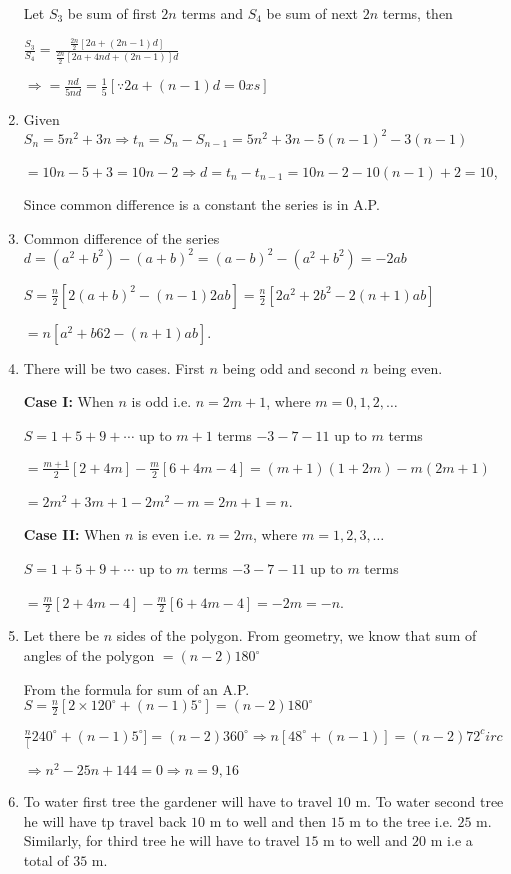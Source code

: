 \begin{enumerate}
  Let $S_3$ be sum of first $2n$ terms and $S_4$ be sum of next $2n$ terms, then

  $\frac{S_3}{S_4} = \frac{\tfrac{2n}{2}[2a + (2n - 1)d]}{\tfrac{2n}{2}[2a + 4nd + (2n - 1)]d}$

  $\Rightarrow = \frac{nd}{5nd} = \frac{1}{5}[\because 2a + (n - 1)d = 0xs]$
\item Given $S_n = 5n^2 + 3n \Rightarrow t_n = S_n - S_{n - 1} = 5n^2 + 3n - 5(n - 1)^2 - 3(n - 1)$

  $= 10n - 5 + 3 = 10n - 2 \Rightarrow d = t_n - t_{n - 1} = 10n - 2 - 10(n - 1) + 2 = 10$,

  Since common difference is a constant the series is in A.P.
\item Common difference of the series $d = (a^2 + b^2) - (a + b)^2 = (a - b)^2 - (a^2 + b^2) = -2ab$

  $S = \frac{n}{2}[2(a + b)^2 - (n - 1)2ab] = \frac{n}{2}[2a^2 + 2b^2 - 2(n + 1)ab]$

  $= n[a^2 + b62 - (n + 1)ab]$.
\item There will be two cases. First $n$ being odd and second $n$ being even.

  {\bf Case I:} When $n$ is odd i.e. $n = 2m + 1$, where $m = 0, 1, 2, \ldots$

  $S = 1 + 5 + 9 + \cdots$ up to $m + 1$ terms $- 3 - 7 - 11$ up to $m$ terms

  $= \frac{m + 1}{2}[2 + 4m] - \frac{m}{2}[6 + 4m - 4] = (m + 1)(1 + 2m) - m(2m + 1)$

  $= 2m^2 + 3m + 1 - 2m^2 - m = 2m + 1 = n$.

  {\bf Case II:} When $n$ is even i.e. $n = 2m$, where $m =1, 2, 3, \ldots$

  $S = 1 + 5 + 9 + \cdots$ up to $m$ terms $- 3 - 7 - 11$ up to $m$ terms

  $= \frac{m}{2}[2 + 4m - 4] - \frac{m}{2}[6 + 4m - 4] = -2m = -n$.
\item Let there be $n$ sides of the polygon. From geometry, we know that sum of angles of the polygon $= (n - 2)180^\circ$

  From the formula for sum of an A.P. $S = \frac{n}{2}[2\times120^\circ + (n - 1)5^\circ] = (n - 2)180^\circ$

  $\frac{n}[240^\circ + (n - 1)5^\circ] = (n - 2)360^\circ\Rightarrow n[48^\circ + (n - 1)] = (n - 2)72^circ$

  $\Rightarrow n^2 - 25n + 144 = 0 \Rightarrow n = 9, 16$
\item To water first tree the gardener will have to travel $10$ m. To water second tree he will
  have tp travel back $10$ m to well and then $15$ m to the tree i.e. $25$ m. Similarly, for third tree he will
  have to travel $15$ m to well and $20$ m i.e a total of $35$ m.


\end{enumerate}
